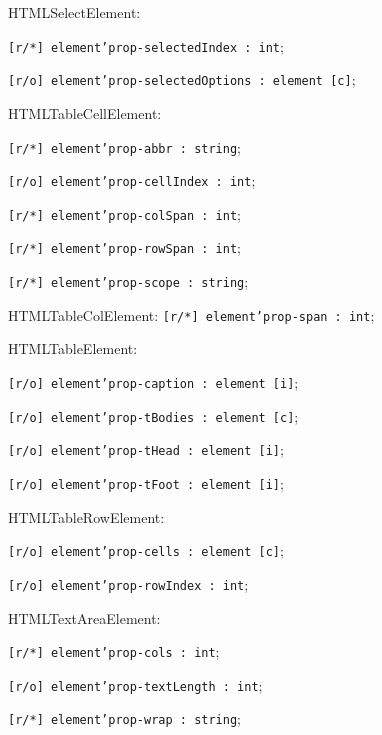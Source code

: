 \begin{icItems}
	\item HTMLSelectElement:
	\begin{icItems}
		\item \texttt{[r/*] element'prop-selectedIndex : int};
		\item \texttt{[r/o] element'prop-selectedOptions : element [c]};
	\end{icItems}
	
	\item HTMLTableCellElement:
	\begin{icItems}
		\item \texttt{[r/*] element'prop-abbr : string};
		\item \texttt{[r/o] element'prop-cellIndex : int};
		\item \texttt{[r/*] element'prop-colSpan : int};
		\item \texttt{[r/*] element'prop-rowSpan : int};
		\item \texttt{[r/*] element'prop-scope : string};
	\end{icItems}
	
	\item HTMLTableColElement: \texttt{[r/*] element'prop-span : int};
	
	\item HTMLTableElement:
	\begin{icItems}
		\item \texttt{[r/o] element'prop-caption : element [i]};
		\item \texttt{[r/o] element'prop-tBodies : element [c]};
		\item \texttt{[r/o] element'prop-tHead : element [i]};
		\item \texttt{[r/o] element'prop-tFoot : element [i]};
	\end{icItems}
	
	\item HTMLTableRowElement:
	\begin{icItems}
		\item \texttt{[r/o] element'prop-cells : element [c]};
		\item \texttt{[r/o] element'prop-rowIndex : int};
	\end{icItems}
	
	\item HTMLTextAreaElement:
	\begin{icItems}
		\item \texttt{[r/*] element'prop-cols : int};
		\item \texttt{[r/o] element'prop-textLength : int};
		\item \texttt{[r/*] element'prop-wrap : string};
	\end{icItems}
	

\end{icItems}
